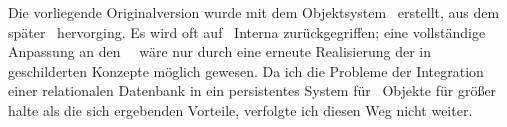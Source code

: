 Die vorliegende Originalversion wurde mit dem Objektsystem
\pcl\ erstellt, aus dem sp\"{a}\-ter \clos\ hervorging.
Es wird oft auf \pcl\ Interna zur\"{u}ckgegriffen; eine
vollst\"{a}ndige Anpassung an den \clos\ \std\ w\"{a}re nur durch eine
erneute Realisierung der in \cite{bib:ro87} geschilderten Konzepte
m\"{o}glich gewesen. Da ich die Probleme der Integration einer
relationalen Datenbank in ein persistentes System f\"{u}r \cl\ Objekte
f\"{u}r gr\"{o}\ss{}er halte als die sich ergebenden Vorteile, verfolgte ich
diesen Weg nicht weiter.
